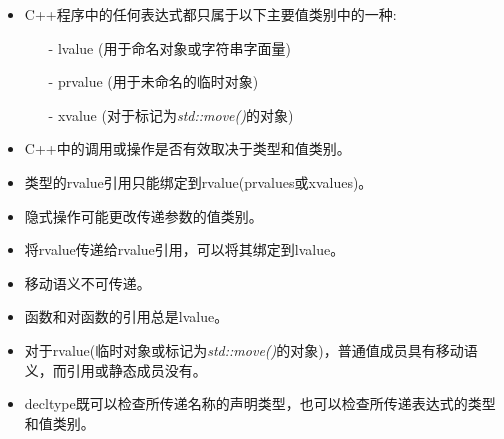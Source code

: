 \begin{itemize}
	\item C++程序中的任何表达式都只属于以下主要值类别中的一种:
	\begin{itemize}
		\item[-] lvalue (用于命名对象或字符串字面量)
		\item[-] prvalue (用于未命名的临时对象)
		\item[-] xvalue (对于标记为\textit{std::move()}的对象)
	\end{itemize}
	\item C++中的调用或操作是否有效取决于类型和值类别。
	\item 类型的rvalue引用只能绑定到rvalue(prvalues或xvalues)。
	\item 隐式操作可能更改传递参数的值类别。
	\item 将rvalue传递给rvalue引用，可以将其绑定到lvalue。
	\item 移动语义不可传递。
	\item 函数和对函数的引用总是lvalue。
	\item 对于rvalue(临时对象或标记为\textit{std::move()}的对象)，普通值成员具有移动语义，而引用或静态成员没有。
	\item decltype既可以检查所传递名称的声明类型，也可以检查所传递表达式的类型和值类别。
\end{itemize}


\newpage